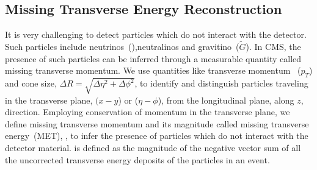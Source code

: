 
\subsection{Missing Transverse Energy Reconstruction}
It is very challenging to detect particles which do not interact with the detector. Such particles include neutrinos~(\Pneutrino),neutralinos and gravitino~($\tilde{G}$). In CMS, the presence of such particles can be inferred through a measurable quantity called missing transverse momentum. We use quantities like transverse momentum ~($p_{T}$) and cone size, $\Delta R = \sqrt{ \Delta\eta^{2} + \Delta\phi^{2} }$, to identify and distinguish particles traveling in the transverse plane, $(x-y$) or ($\eta-\phi$), from the longitudinal plane, along $z$, direction. Employing conservation of momentum in the transverse plane, we define
missing transverse momentum and its magnitude called missing transverse energy~(MET), \MET, to infer the presence of particles
which do not interact with the detector material.
\newline
\MET is defined as the magnitude of the negative vector sum of all the uncorrected transverse energy deposits of the particles in an event.

